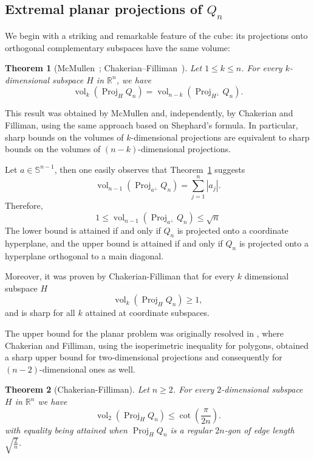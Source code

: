 \documentclass[10pt]{amsart}
\newcommand{\ls}{\leqslant}
\newcommand{\gr}{\geqslant}
\newcommand{\1}{\textbf{1}}
\numberwithin{equation}{section} %
\newtheorem{theorem}{Theorem}[section] %
\theoremstyle{remark}
\theoremstyle{definition}
\begin{document}
\subsection{Extremal planar projections of $Q_n$}
We begin with a   striking and remarkable feature of the cube: its projections onto orthogonal complementary subspaces have the same volume: 
\begin{theorem}[McMullen~\cite{mcmullen1984volumes}; Chakerian--Filliman~\cite{chakerian1986measures}]\label{symmetry cube}
Let $1\ls k \ls n$. For every $k$-dimensional subspace $H$ in $\mathbb{R}^n$, we have 
\[
\operatorname{vol}_k(\operatorname{Proj}_H Q_n)=\operatorname{vol}_{n-k}(\operatorname{Proj}_{H^{\perp}}Q_n).
\]
\end{theorem}
This result was obtained by McMullen and, independently, by Chakerian and Filliman, using the same approach based on Shephard's formula. In particular, sharp bounds on the volumes of $k$-dimensional projections are equivalent to sharp bounds on the volumes of $(n-k)$-dimensional projections.

Let $a\in \mathbb{S}^{n-1}$, then one easily observes that Theorem~\ref{symmetry cube} suggests
\begin{equation}\label{cauchy cube}
\operatorname{vol}_{n-1}(\operatorname{Proj}_{a^{\perp}}Q_n)=\sum_{j=1}^n|a_j|.
\end{equation}
Therefore,
\[
1\ls  \operatorname{vol}_{n-1}(\operatorname{Proj}_{a^{\perp}}Q_n) \ls \sqrt{n}
\]
The lower bound is attained if and only if $Q_n$ is projected onto a coordinate hyperplane, and the upper bound is attained if and only if $Q_n$ is projected onto a hyperplane orthogonal to a main diagonal.

Moreover, it was proven by Chakerian-Filliman that for every $k$ dimensional subspace $H$ $$\operatorname{vol}_k(\operatorname{Proj}_HQ_n)\gr1,$$ and is sharp for all $k$ attained at coordinate subspaces.

 The upper bound for the planar problem was originally resolved in \cite{chakerian1986measures}, where Chakerian and Filliman, using the isoperimetric inequality for polygons, obtained a sharp upper bound for two-dimensional projections and consequently for $(n-2)$-dimensional ones as well.
 \begin{theorem}[Chakerian-Filliman]\label{planar proj cube Chak-Fill}
 Let $n\gr2$. For every $2$-dimensional subspace $H$ in $\mathbb{R}^n$ we have 
 \[
  \operatorname{vol}_2(\operatorname{Proj}_H Q_n)\ls \cot\left(\frac{\pi}{2n}\right).
 \]
 with equality being attained when $\operatorname{Proj}_HQ_n$ is a regular $2n$-gon of edge length $\sqrt{\frac{2}{n}}$.
 \end{theorem}
\end{document}

